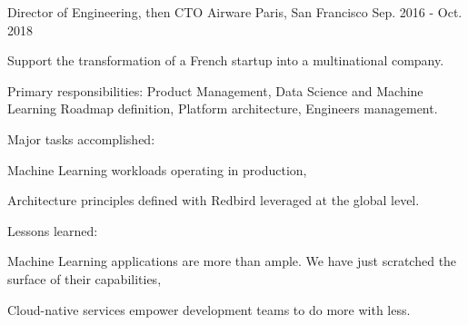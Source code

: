 \begin{cventries}
  \cventry
    {Director of Engineering, then CTO} %
    {Airware} %
    {Paris, San Francisco} %
    {Sep. 2016 - Oct. 2018} %
    {
      \begin{cvitems} %
        \item {Support the transformation of a French startup into a multinational company.}
        \item {Primary responsibilities: Product Management, Data Science and Machine Learning Roadmap definition, Platform architecture, Engineers management.}
        \item {Major tasks accomplished:}
        \begin{cvsubitems}
          \item {Machine Learning workloads operating in production,}
          \item {Architecture principles defined with Redbird leveraged at the global level.}
        \end{cvsubitems}
        \item {Lessons learned:}
        \begin{cvsubitems}
          \item {Machine Learning applications are more than ample. We have just scratched the surface of their capabilities,}
          \item {Cloud-native services empower development teams to do more with less.}
        \end{cvsubitems}
      \end{cvitems}
    }


\end{cventries}
